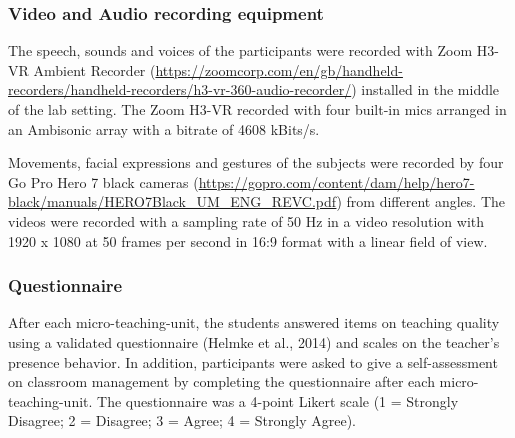 \documentclass[
  man,floatsintext]{apa6}
\begin{document}
\hypertarget{video-and-audio-recording-equipment}{%
\subsubsection{Video and Audio recording equipment}\label{video-and-audio-recording-equipment}}

The speech, sounds and voices of the participants were recorded with Zoom H3-VR Ambient Recorder (\url{https://zoomcorp.com/en/gb/handheld-recorders/handheld-recorders/h3-vr-360-audio-recorder/}) installed in the middle of the lab setting. The Zoom H3-VR recorded with four built-in mics arranged in an Ambisonic array with a bitrate of 4608 kBits/s.

Movements, facial expressions and gestures of the subjects were recorded by four Go Pro Hero 7 black cameras (\url{https://gopro.com/content/dam/help/hero7-black/manuals/HERO7Black_UM_ENG_REVC.pdf}) from different angles. The videos were recorded with a sampling rate of 50 Hz in a video resolution with 1920 x 1080 at 50 frames per second in 16:9 format with a linear field of view.

\hypertarget{questionnaire}{%
\subsubsection{Questionnaire}\label{questionnaire}}

After each micro-teaching-unit, the students answered items on teaching quality using a validated questionnaire (Helmke et al., 2014) and scales on the teacher's presence behavior. In addition, participants were asked to give a self-assessment on classroom management by completing the questionnaire after each micro-teaching-unit. The questionnaire was a 4-point Likert scale (1 = Strongly Disagree; 2 = Disagree; 3 = Agree; 4 = Strongly Agree).
\end{document}
